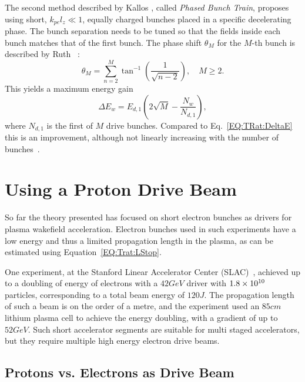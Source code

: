 The second method described by Kallos \etal, called \textit{Phased Bunch Train}, proposes using short, $k_{pe}l_{z} \ll 1$, equally charged bunches placed in a specific decelerating phase.
The bunch separation needs to be tuned so that the fields inside each bunch matches that of the first bunch.
The phase shift $\theta_{M}$ for the $M$-th bunch is described by Ruth \etal~\cite{ruth:1985}:
\begin{equation}
    \theta_{M} = \sum^{M}_{n=2}\tan^{-1}\left(\frac{1}{\sqrt{n-2}}\right),\quad M \geq 2. \label{EQ:TrainPhase}
\end{equation}
This yields a maximum energy gain
\begin{equation}
    \Delta E_{w} = E_{d,1}\left(2\sqrt{M}-\frac{N_{w}}{N_{d,1}}\right), \label{EQ:TrainPhaseMaxE}
\end{equation}
where $N_{d,1}$ is the first of $M$ drive bunches.
Compared to Eq.~\ref{EQ:TRat:DeltaE} this is an improvement, although not linearly increasing with the number of bunches~\cite{ruth:1985}.

\section{Using a Proton Drive Beam}
\label{Int:DBeam}

So far the theory presented has focused on short electron bunches as drivers for plasma wakefield acceleration.
Electron bunches used in such experiments have a low energy and thus a limited propagation length in the plasma, as can be estimated using Equation~\ref{EQ:Trat:LStop}.

One experiment, at the Stanford Linear Accelerator Center (SLAC)~\cite{blumenfeld:2007}, achieved up to a doubling of energy of electrons with a $42\unit{GeV}$ driver with $1.8\times 10^{10}$ particles, corresponding to a total beam energy of $120\unit{J}$.
The propagation length of such a beam is on the order of a metre, and the experiment used an $85\unit{cm}$ lithium plasma cell to achieve the energy doubling, with a gradient of up to $52\unit{GeV}$.
Such short accelerator segments are suitable for multi staged accelerators, but they require multiple high energy electron drive beams. 

\subsection{Protons vs. Electrons as Drive Beam}
\label{Int:DBeam:PDPWFA}

